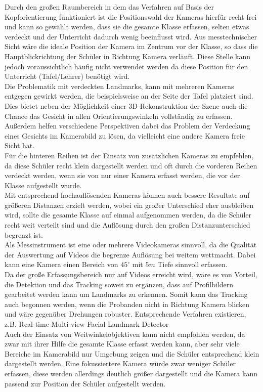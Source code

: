 Durch den großen Raumbereich in dem das Verfahren auf Basis der Kopforientierung funktioniert ist die Positionswahl der Kameras hierfür recht frei und kann so gewählt werden, dass sie die gesamte Klasse erfassen, selten etwas verdeckt und der Unterricht dadurch wenig beeinflusst wird. Aus messtechnischer Sicht wäre die ideale Position der Kamera im Zentrum vor der Klasse, so dass die Hauptblickrichtung der Schüler in Richtung Kamera verläuft. Diese Stelle kann jedoch voraussichtlich häufig nicht verwendet werden da diese Position für den Unterricht (Tafel/Lehrer) benötigt wird.\\
Die Problematik mit verdeckten Landmarks, kann mit mehreren Kameras entgegen gewirkt werden, die beispielsweise an der Seite der Tafel platziert sind. Dies bietet neben der Möglichkeit einer 3D-Rekonstruktion der Szene auch die Chance das Gesicht in allen Orientierungswinkeln vollständig zu erfassen. Außerdem helfen verschiedene Perspektiven dabei das Problem der Verdeckung eines Gesichts im Kamerabild zu lösen, da vielleicht eine andere Kamera freie Sicht hat.\\
Für die hinteren Reihen ist der Einsatz von zusätzlichen Kameras zu empfehlen, da diese Schüler recht klein dargestellt werden und oft durch die vorderen Reihen verdeckt werden, wenn sie von nur einer Kamera erfasst werden, die vor der Klasse aufgestellt wurde.\\
Mit entsprechend hochauflösenden Kameras können auch bessere Resultate auf größeren Distanzen erzielt werden, wobei ein großer Unterschied eher ausbleiben wird, sollte die gesamte Klasse auf einmal aufgenommen werden, da die Schüler recht weit verteilt sind und die Auflösung durch den großen Distanzunterschied begrenzt ist.\\ 
Als Messinstrument ist eine oder mehrere Videokameras sinnvoll, da die Qualität der Auswertung auf Videos die begrenze Auflösung bei weitem wettmacht. Dabei kann eine Kamera einen Bereich von $45^\circ$ mit $5m$ Tiefe sinnvoll erfassen.\\
Da der große Erfassungsbereich nur auf Videos erreicht wird, wäre es von Vorteil, die Detektion und das Tracking soweit zu ergänzen, dass auf Profilbildern gearbeitet werden kann um Landmarks zu erkennen. Somit kann das Tracking auch begonnen werden, wenn die Probanden nicht in Richtung Kamera blicken und wäre gegenüber Drehungen robuster. Entsprechende Verfahren existieren, z.B. Real-time Multi-view Facial Landmark Detector \cite{Uricar-etal-BWILD-2015}\\
Auch der Einsatz von Weitwinkelobjektiven kann nicht empfohlen werden, da zwar mit ihrer Hilfe die gesamte Klasse erfasst werden kann, aber sehr viele Bereiche im Kamerabild nur Umgebung zeigen und die Schüler entsprechend klein dargestellt werden. Eine fokussiertere Kamera würde zwar weniger Schüler erfassen, diese werden allerdings deutlich größer dargestellt und die Kamera kann passend zur Position der Schüler aufgestellt werden.\\
